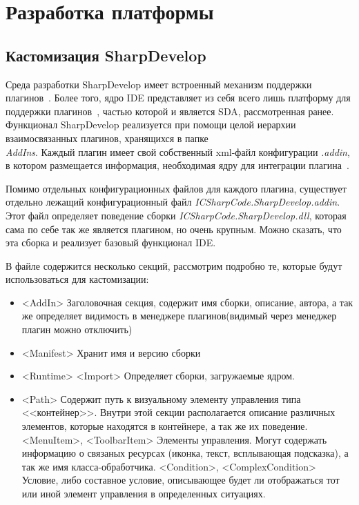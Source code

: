\section{Разработка платформы}
\label{sec:dev-details}



\subsection{Кастомизация SharpDevelop}
\label{sec:sd_custom}

Среда разработки SharpDevelop имеет встроенный механизм поддержки плагинов~\cite{sharpdevelop}. Более того, ядро IDE представляет из себя всего лишь платформу для поддержки плагинов~\cite{use-sd-core}, частью которой и является SDA, рассмотренная ранее. Функционал SharpDevelop реализуется при помощи целой иерархии взаимосвязанных плагинов, хранящихся в папке {\it \\AddIns}. Каждый плагин имеет свой собственный xml-файл конфигурации {\it *.addin}, в котором размещается информация, необходимая ядру для интеграции плагина~\cite{writing-sd-addin}. 

Помимо отдельных конфигурационных файлов для каждого плагина, существует отдельно лежащий конфигурационный файл {\it ICSharpCode.SharpDevelop.addin}. Этот файл определяет поведение сборки {\it ICSharpCode.SharpDevelop.dll}, которая сама по себе так же является плагином, но очень крупным. Можно сказать, что эта сборка и реализует базовый функционал IDE.

В файле содержится несколько секций, рассмотрим подробно те, которые будут использоваться для кастомизации: 

\begin{itemize}
 \item <AddIn> Заголовочная секция, содержит имя сборки, описание, автора, а так же определяет видимость в менеджере плагинов(видимый через менеджер плагин можно отключить)
 \item <Manifest> Хранит имя и версию сборки
 \item <Runtime> <Import> Определяет сборки, загружаемые ядром.
 \item <Path> Содержит путь к визуальному элементу управления типа <<контейнер>>. Внутри этой секции располагается описание различных элементов, которые находятся в контейнере, а так же их поведение.
   \subitem <MenuItem>, <ToolbarItem> Элементы управления. Могут содержать информацию о связаных ресурсах (иконка, текст, всплывающая подсказка), а так же имя класса-обработчика.
   \subitem <Condition>, <ComplexCondition> Условие, либо составное условие, описывающее будет ли отображаться тот или иной элемент управления в определенных ситуациях.
\end{itemize}

